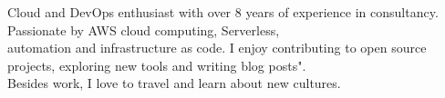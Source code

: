 

\begin{cvparagraph}

Cloud and DevOps enthusiast with over 8 years of experience in consultancy.
Passionate by AWS cloud computing, Serverless,\\automation and infrastructure as code. 
I enjoy contributing to open source projects, exploring new tools and writing blog posts".\\
Besides work, I love to travel and learn about new cultures. 
\end{cvparagraph}
